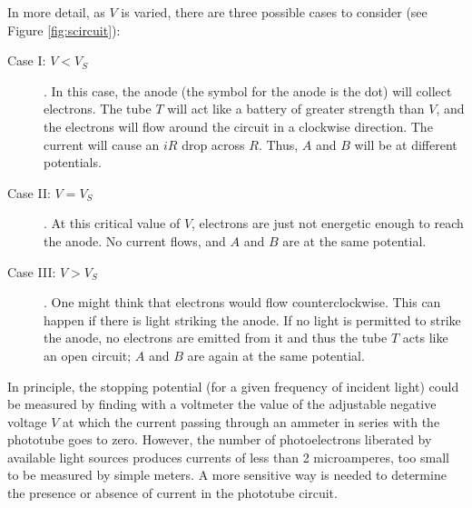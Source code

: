 In more detail, as $V$ is varied, there are three possible cases to consider (see Figure {\ref{fig:scircuit}}):

\begin{description}
\item[Case I: $V < V_S$].  In this case, the anode (the symbol for the anode is the dot) will collect electrons. The tube $T$ will act like a battery of greater strength than $V$, and the electrons will flow around the circuit in a clockwise direction. The current will cause an $iR$ drop across $R$. Thus, $A$ and $B$ will be at different potentials.
\item[Case II: $V = V_S$].  At this critical value of $V$, electrons are just not energetic enough to reach the anode. No current flows, and $A$ and $B$ are at the same potential.
\item[Case III: $V > V_S$].  One might think that electrons would flow counterclockwise. This can happen if there is light striking the anode. If no light is permitted to strike the anode, no electrons are emitted from it and thus the tube $T$ acts like an open circuit; $A$ and $B$ are again at the same potential.
\end{description}

In principle, the stopping potential (for a given frequency of incident light) could be measured by finding with a voltmeter the value of the adjustable negative voltage $V$ at which the current passing through an ammeter in series with the phototube goes to zero. However, the number of photoelectrons liberated by available light sources produces currents of less than 2 microamperes, too small to be measured by simple meters. A more sensitive way is needed to determine the presence or absence of current in the phototube circuit. \myskip

